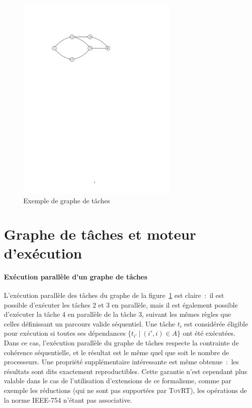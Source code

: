 \documentclass[11pt]{article}
\theoremstyle{plain} %
\theoremstyle{definition} %
\begin{document}
\begin{figure}[!htpb]
  \centering
  \includegraphics[width=8cm]{figures/dag_exemple.pdf}
  \caption{Exemple de graphe de tâches}
  \label{fig:exemple-dag}
\end{figure}

\section{Graphe de tâches et moteur d'exécution}
\label{sec:graphes-de-tache}

\paragraph{Exécution parallèle d'un graphe de tâches}
\label{sec:exec-parall-dun}
L'exécution parallèle des tâches du graphe de la figure~\ref{fig:exemple-dag} est claire~:~il est possible d'exécuter les tâches 2 et 3 en parallèle, mais il est également possible d'exécuter la tâche 4 en parallèle de la tâche 3, suivant les mêmes règles que celles définissant un parcours valide séquentiel.
Une tâche $t_i$ est considérée éligible pour exécution si toutes ses dépendances $\{t_{i'} \ |\ (i', i) \in A\}$ ont été exécutées.
Dans ce cas, l'exécution parallèle du graphe de tâches respecte la contrainte de cohérence séquentielle, et le résultat est le même quel que soit le nombre de processeurs.
Une propriété supplémentaire intéressante est même obtenue~:~les résultats sont dits exactement reproductibles.
Cette garantie n'est cependant plus valable dans le cas de l'utilisation d'extensions de ce formalisme, comme par exemple les réductions (qui ne sont pas supportées par \textsc{ToyRT}), les opérations de la norme IEEE-754 n'étant pas associative.
\end{document}
